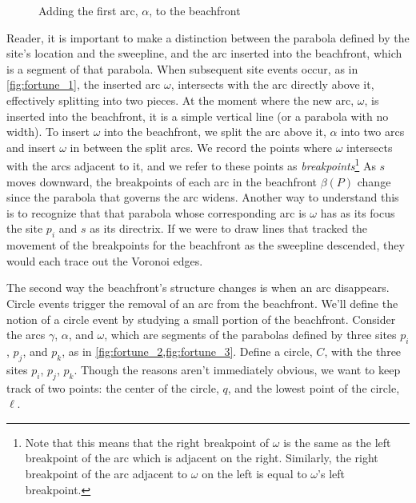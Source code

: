 \documentclass[12pt,twoside]{reedthesis}
\begin{document}

        \begin{figure}[!h]        
          \centering
          
          \caption{Adding the first arc, $\alpha$, to the beachfront}
          \label{fig:beachfront_se}
        \end{figure}

        Reader, it is important to make a distinction between the parabola defined by the site's location and the sweepline, and the arc inserted into the beachfront, which is a segment of that parabola. When subsequent site events occur, as in \cref{fig:fortune_1}, the inserted arc $\omega$, intersects with the arc directly above it, effectively splitting into two pieces. At the moment where the new arc, $\omega$, is inserted into the beachfront, it is a simple vertical line (or a parabola with no width). To insert $\omega$ into the beachfront, we split the arc above it, $\alpha$ into two arcs and insert $\omega$ in between the split arcs. We record the points where $\omega$ intersects with the arcs adjacent to it, and we refer to these points as \emph{breakpoints}\footnote{Note that this means that the right breakpoint of $\omega$ is the same as the left breakpoint of the arc which is adjacent on the right. Similarly, the right breakpoint of the arc adjacent to $\omega$ on the left is equal to $\omega$'s left breakpoint.} As $s$ moves downward, the breakpoints of each arc in the beachfront $\beta(P)$ change since the parabola that governs the arc widens. Another way to understand this is to recognize that that parabola whose corresponding arc is $\omega$ has as its focus the site $p_{i}$ and $s$ as its directrix. If we were to draw lines that tracked the movement of the breakpoints for the beachfront as the sweepline descended, they would each trace out the Voronoi edges. \par


        The second way the beachfront's structure changes is when an arc disappears. Circle events trigger the removal of an arc from the beachfront. We'll define the notion of a circle event by studying a small portion of the beachfront. Consider the arcs $\gamma$, $\alpha$, and $\omega$, which are segments of the parabolas defined by three sites $p_{i}$, $p_{j}$, and $p_{k}$, as in \cref{fig:fortune_2,fig:fortune_3}. Define a circle, $C$, with the three sites $p_{i}$, $p_{j}$, $p_{k}$. Though the reasons aren't immediately obvious, we want to keep track of two points: the center of the circle, $q$, and the lowest point of the circle, $\ell$.\par
\end{document}
